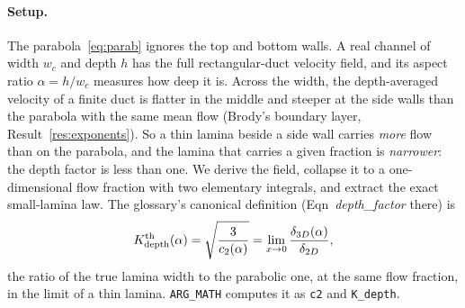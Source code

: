 \label{res:depth-factor}

\paragraph{Setup.} The parabola~\eqref{eq:parab} ignores the top and bottom walls. A real
channel of width $w_c$ and depth $h$ has the full rectangular-duct velocity field, and its
aspect ratio $\alpha=h/w_c$ measures how deep it is. Across the width, the depth-averaged
velocity of a finite duct is flatter in the middle and steeper at the side walls than the
parabola with the same mean flow (Brody's boundary layer, Result~\ref{res:exponents}). So a
thin lamina beside a side wall carries \emph{more} flow than on the parabola, and the lamina
that carries a given fraction is \emph{narrower}: the depth factor is less than one. We derive
the field, collapse it to a one-dimensional flow fraction with two elementary integrals, and
extract the exact small-lamina law. The glossary's canonical definition
(Eqn~\textit{depth\_factor} there) is
\begin{equation}
K_{\mathrm{depth}}^{\mathrm{th}}(\alpha)=\sqrt{\frac{3}{c_2(\alpha)}}=\lim_{x\to0}\frac{\delta_{3D}(\alpha)}{\delta_{2D}},
\label{eq:Kdef}
\end{equation}
the ratio of the true lamina width to the parabolic one, at the same flow fraction, in the limit
of a thin lamina. \texttt{ARG\_MATH} computes it as \texttt{c2} and \texttt{K\_depth}.

